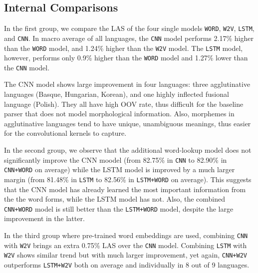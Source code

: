 \documentclass[11pt,a4paper]{article}
\begin{document}
  \subsection{Internal Comparisons}
    In the first group, we compare the LAS of the four single models \texttt{WORD}, \texttt{W2V}, \texttt{LSTM}, and \texttt{CNN}.
    In macro average of all languages, the \texttt{CNN} model performs 2.17\% higher than the \texttt{WORD} model, and 1.24\% higher than the \texttt{W2V} model. 
    The \texttt{LSTM} model, however, performs only 0.9\% higher than the \texttt{WORD} model and 1.27\% lower than the \texttt{CNN} model. 

    The CNN model shows large improvement in four languages: three agglutinative languages (Basque, Hungarian, Korean), and one highly inflected fusional language (Polish). They all have high OOV rate, thus difficult for the baseline parser that does not model morphological information. Also, morphemes in agglutinative languages tend to have unique, unambiguous meanings, thus easier for the convolutional kernels to capture.

    In the second group, we observe that the additional word-lookup model does not significantly improve the CNN moodel (from 82.75\% in \texttt{CNN} to 82.90\% in \texttt{CNN+WORD} on average) while the LSTM model is improved by a much larger margin (from 81.48\% in \texttt{LSTM} to 82.56\% in \texttt{LSTM+WORD} on average). This suggests that the CNN model has already learned the most important information from the the word forms, while the LSTM model has not.
    Also, the combined \texttt{CNN+WORD} model is still better than the \texttt{LSTM+WORD} model, despite the large improvement in the latter.


    In the third group where pre-trained word embeddings are used, combining \texttt{CNN} with \texttt{W2V} brings an extra 0.75\% LAS over the \texttt{CNN} model. Combining \texttt{LSTM} with \texttt{W2V} shows similar trend but with much larger improvement, yet again, \texttt{CNN+W2V} outperforms \texttt{LSTM+W2V}
    both on average and individually in 8 out of 9 languages.
\end{document}
